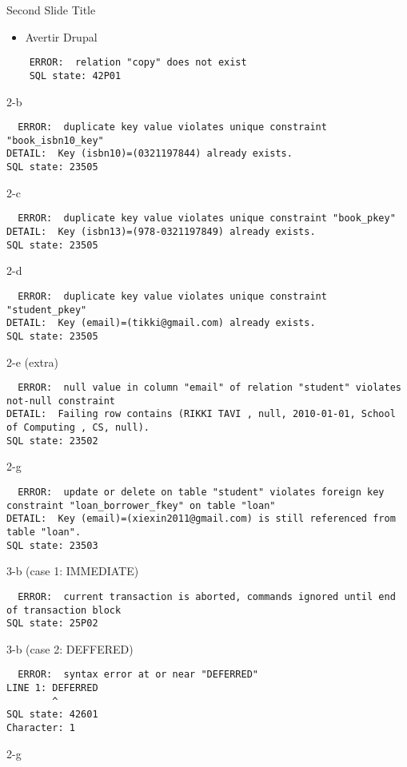 \begin{frame}[fragile]{Second Slide Title} 
	
	\begin{itemize}
		\item Avertir Drupal
	\end{itemize}
  \begin{lstlisting}
  	ERROR:  relation "copy" does not exist
    SQL state: 42P01
  \end{lstlisting}
  
  2-b
  \begin{lstlisting}
  ERROR:  duplicate key value violates unique constraint "book_isbn10_key"
DETAIL:  Key (isbn10)=(0321197844) already exists.
SQL state: 23505
  \end{lstlisting}
  
  2-c
  \begin{lstlisting}
  ERROR:  duplicate key value violates unique constraint "book_pkey"
DETAIL:  Key (isbn13)=(978-0321197849) already exists.
SQL state: 23505
  \end{lstlisting}
  
  2-d
  \begin{lstlisting}
  ERROR:  duplicate key value violates unique constraint "student_pkey"
DETAIL:  Key (email)=(tikki@gmail.com) already exists.
SQL state: 23505
  \end{lstlisting}
  
  2-e (extra)
  \begin{lstlisting}
  ERROR:  null value in column "email" of relation "student" violates not-null constraint
DETAIL:  Failing row contains (RIKKI TAVI , null, 2010-01-01, School of Computing , CS, null).
SQL state: 23502
  \end{lstlisting}
  
  2-g
  \begin{lstlisting}
  ERROR:  update or delete on table "student" violates foreign key constraint "loan_borrower_fkey" on table "loan"
DETAIL:  Key (email)=(xiexin2011@gmail.com) is still referenced from table "loan".
SQL state: 23503
  \end{lstlisting}
  
  3-b (case 1: IMMEDIATE)
  \begin{lstlisting}
  ERROR:  current transaction is aborted, commands ignored until end of transaction block
SQL state: 25P02
  \end{lstlisting}
  
  3-b (case 2: DEFFERED)
  \begin{lstlisting}
  ERROR:  syntax error at or near "DEFERRED"
LINE 1: DEFERRED
        ^
SQL state: 42601
Character: 1
  \end{lstlisting}
  
  2-g
  \begin{lstlisting}
  
  \end{lstlisting}
\end{frame}
